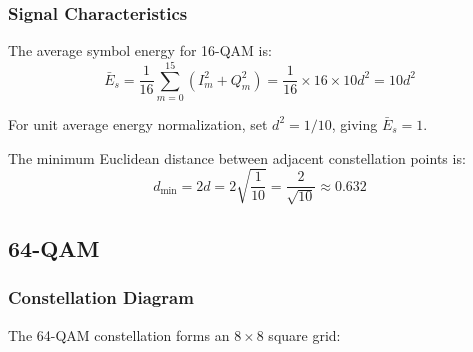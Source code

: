 \subsubsection{Signal Characteristics}

The average symbol energy for 16-QAM is:
\begin{equation}
\bar{E}_s = \frac{1}{16}\sum_{m=0}^{15} (I_m^2 + Q_m^2) = \frac{1}{16} \times 16 \times 10d^2 = 10d^2
\label{eq:16qam-energy}
\end{equation}

For unit average energy normalization, set $d^2 = 1/10$, giving $\bar{E}_s = 1$.

The minimum Euclidean distance between adjacent constellation points is:
\begin{equation}
d_{\min} = 2d = 2\sqrt{\frac{1}{10}} = \frac{2}{\sqrt{10}} \approx 0.632
\label{eq:16qam-distance}
\end{equation}

\subsection{64-QAM}

\subsubsection{Constellation Diagram}

The 64-QAM constellation forms an $8 \times 8$ square grid:

\begin{center}
\end{center}

